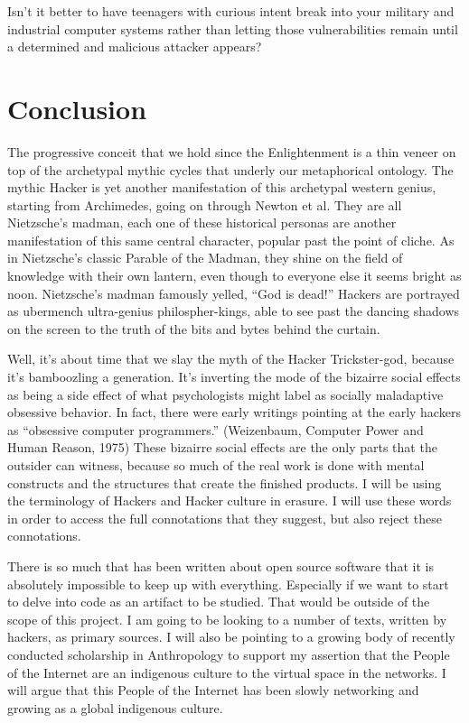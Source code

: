 \documentclass[11pt]{article}
\begin{document}
Isn't it better to have teenagers with curious intent break into your military and industrial computer systems rather than letting those vulnerabilities remain until a determined and malicious attacker appears?

\section{Conclusion}



The progressive conceit that we hold since the Enlightenment is a thin veneer on top of the archetypal mythic cycles that underly our metaphorical ontology.  The mythic Hacker is yet another manifestation of this archetypal western genius, starting from Archimedes, going on through Newton et al.  They are all Nietzsche’s madman, each one of these historical personas are another manifestation of this same central character, popular past the point of cliche. As in Nietzsche’s classic Parable of the Madman, they shine on the field of knowledge with their own lantern, even though to everyone else it seems bright as noon. Nietzsche’s madman famously yelled, “God is dead!” Hackers are portrayed as ubermench ultra-genius philospher-kings, able to see past the dancing shadows on the screen to the truth of the bits and bytes behind the curtain.

Well, it’s about time that we slay the myth of the Hacker Trickster-god, because it’s bamboozling a generation. It’s inverting the mode of the bizairre social effects as being a side effect of what psychologists might label as socially maladaptive obsessive behavior. In fact, there were early writings pointing at the early hackers as “obsessive computer programmers.” (Weizenbaum, Computer Power and Human Reason, 1975) These bizairre social effects are the only parts that the outsider can witness, because so much of the real work is done with mental constructs and the structures that create the finished products. I will be using the terminology of Hackers and Hacker culture in erasure. I will use these words in order to access the full connotations that they suggest, but also reject these connotations.

There is so much that has been written about open source software that it is absolutely impossible to keep up with everything. Especially if we want to start to delve into code as an artifact to be studied. That would be outside of the scope of this project.  I am going to be looking to a number of texts, written by hackers, as primary sources. I will also be pointing to a growing body of recently conducted scholarship in Anthropology to support my assertion that the People of the Internet are an indigenous culture to the virtual space in the networks. I will argue that this People of the Internet has been slowly networking and growing as a global indigenous culture.
\end{document}
